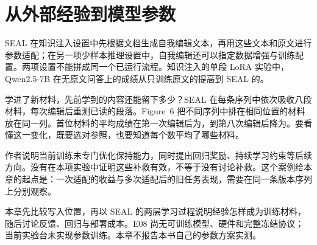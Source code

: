 \chapter{从外部经验到模型参数}
\label{ch10}


\begin{failurebox}
SEAL 在知识注入设置中先根据文档生成自我编辑文本，再用这些文本和原文进行参数适配；在另一项少样本推理设置中，自我编辑还可以指定数据增强与训练配置。两项设置不能拼成同一个已运行流程\cite{seal-2506}。知识注入的单段 LoRA 实验中，Qwen2.5-7B 在无原文问答上的成绩从只训练原文的提高到 SEAL 的。

学进了新材料，先前学到的内容还能留下多少？SEAL 在每条序列中依次吸收八段材料，每次编辑后重测已读的段落。Figure~6 把不同序列中排在相同位置的材料放在同一列。首位材料的平均成绩在第一次编辑后为，到第八次编辑后降为\cite{seal-2506}。要看懂这一变化，既要选对参照，也要知道每个数平均了哪些材料。

作者说明当前训练未专门优化保持能力，同时提出回归奖励、持续学习约束等后续方向。没有在本项实验中证明这些补救有效，不等于没有讨论补救。这个案例给本章的起点是：一次适配的收益与多次适配后的旧任务表现，需要在同一条版本序列上分别观察。
\end{failurebox}


本章先比较写入位置，再以 SEAL 的两层学习过程说明经验怎样成为训练材料，随后讨论反馈、回归与部署成本。E08 尚无可训练模型、硬件和完整冻结协议；当前实验台未实现参数训练。本章不报告本书自己的参数方案实测。

